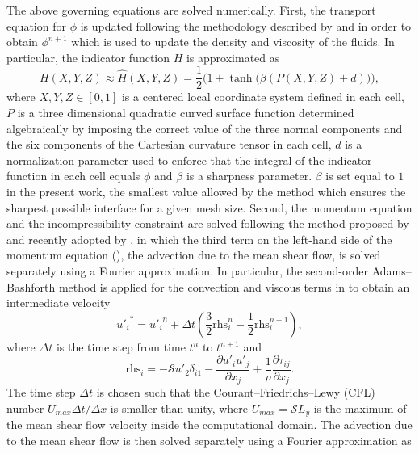 The above governing equations are solved numerically. First, the transport equation for $\phi$ is updated following the methodology described by \cite{ii_sugiyama_takeuchi_takagi_matsumoto_xiao_2012a} and \cite{rosti_de-vita_brandt_2019a} in order to obtain $\phi^{n+1}$ which is used to update the density and viscosity of the fluids. In particular, the indicator function $H$ is approximated as
\begin{equation} \label{eq:vofInd}
H \left( X, Y, Z \right) \approx \widehat{H} \left( X, Y, Z \right) = \frac{1}{2} \bigg( 1+ \tanh \big( \beta \left( P \left( X, Y, Z \right) + d \right) \big) \bigg),
\end{equation}
where $X, Y, Z \in \left[0, 1 \right]$ is a centered local coordinate system defined in each cell, $P$ is a three dimensional quadratic curved surface function determined algebraically by imposing the correct value of the three normal components and the six components of the Cartesian curvature tensor in each cell, $d$ is a normalization parameter used to enforce that the integral of the indicator function in each cell equals $\phi$ and $\beta$ is a sharpness parameter. $\beta$ is set equal to $1$ in the present work, the smallest value allowed by the method which ensures the sharpest possible interface for a given mesh size. Second, the momentum equation and the incompressibility constraint are solved following the method proposed by \cite{gerz_schumann_elghobashi_1989a} and recently adopted by \cite{tanaka_2017a}, in which the third term on the left-hand side of the momentum equation (), \ie the advection due to the mean shear flow, is solved separately using a Fourier approximation. In particular, the second-order Adams--Bashforth method is applied for the convection and viscous terms in  to obtain an intermediate velocity
\begin{equation}
{u'_i}^*= {u'_i}^n + \Delta t \left( \frac{3}{2} \textrm{rhs}^n_i - \frac{1}{2} \textrm{rhs}^{n-1}_i \right),
\end{equation}
where $\Delta t$ is the time step from time $t^n$ to $t^{n+1}$ and
\begin{equation}
\textrm{rhs}_i=-\mathcal{S} u'_2 \delta_{i1} - \frac{\partial u'_i u'_j}{\partial x_j} + \frac{1}{\rho} \frac{\partial \tau_{ij}}{\partial x_j}.
\end{equation}
The time step $\Delta t$ is chosen such that the Courant--Friedrichs--Lewy (CFL) number $U_{max} \Delta t/\Delta x$ is smaller than unity, where $U_{max} = \mathcal{S} L_y$ is the maximum of the mean shear flow  velocity inside the computational domain. The advection due to the mean shear flow is then solved separately using a Fourier approximation as
